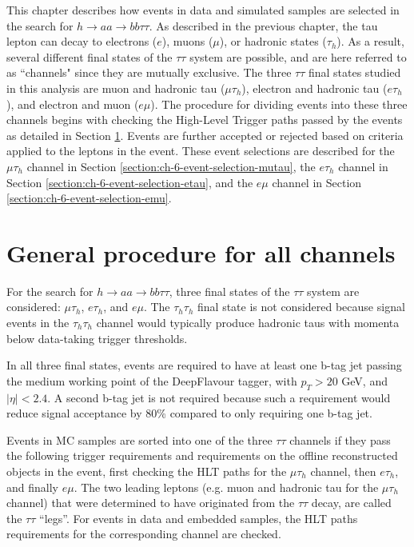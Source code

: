This chapter describes how events in data and simulated samples are selected in the search for $h \rightarrow aa \rightarrow bb\tau\tau$. As described in the previous chapter, the tau lepton can decay to electrons ($e$), muons ($\mu$), or hadronic states ($\tau_{h}$). As a result, several different final states of the $\tau\tau$ system are possible, and are here referred to as ``channels" since they are mutually exclusive. The three $\tau\tau$ final states studied in this analysis are muon and hadronic tau ($\mu\tau_{h}$), electron and hadronic tau ($e\tau_{h}$), and electron and muon ($e\mu$). The procedure for dividing events into these three channels begins with checking the High-Level Trigger paths passed by the events as detailed in Section \ref{section:general_event_selection}. Events are further accepted or rejected based on criteria applied to the leptons in the event. These event selections are described for the $\mu\tau_{h}$ channel in Section \ref{section:ch-6-event-selection-mutau}, the $e\tau_{h}$ channel in Section \ref{section:ch-6-event-selection-etau}, and the $e\mu$ channel in Section \ref{section:ch-6-event-selection-emu}.


\section{General procedure for all channels}
\label{section:general_event_selection}
For the search for $h \rightarrow aa \rightarrow bb\tau\tau$, three final states of the $\tau\tau$ system are considered: $\mu\tau_{h}$, $e\tau_{h}$, and $e\mu$. The $\tau_{h}\tau_{h}$ final state is not considered because signal events in the $\tau_{h}\tau_{h}$ channel would typically produce hadronic taus with momenta below data-taking trigger thresholds.

In all three final states, events are required to have at least one b-tag jet passing the medium working point of the DeepFlavour tagger, with $p_{T} > 20$ GeV, and $|\eta| < 2.4$. A second b-tag jet is not required because such a requirement would reduce signal acceptance by 80\% compared to only requiring one b-tag jet.

Events in MC samples are sorted into one of the three $\tau\tau$ channels if they pass the following trigger requirements and requirements on the offline reconstructed objects in the event, first checking the HLT paths for the $\mu\tau_{h}$ channel, then $e\tau_{h}$, and finally $e\mu$. The two leading leptons (e.g. muon and hadronic tau for the $\mu\tau_{h}$ channel) that were determined to have originated from the $\tau\tau$ decay, are called the $\tau\tau$ ``legs''. For events in data and embedded samples, the HLT paths requirements for the corresponding channel are checked.

